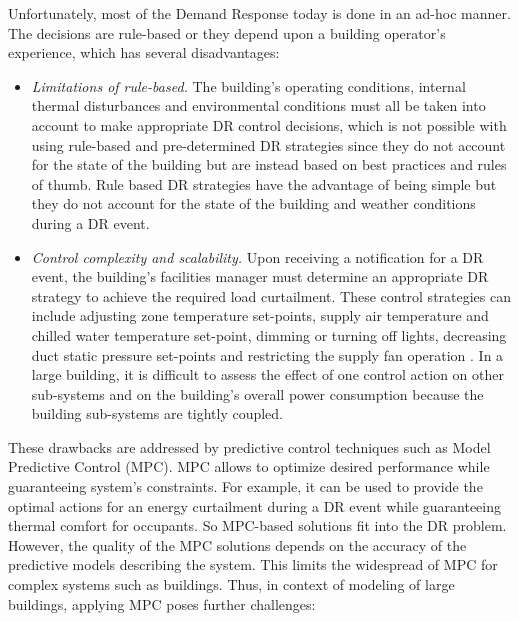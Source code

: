 Unfortunately, most of the Demand Response today is done in an ad-hoc manner. 
The decisions are rule-based or they depend upon a building operator's experience, which has several disadvantages:

\begin{itemize}[leftmargin=0.5cm]
	\item \emph{Limitations of rule-based.} The building's operating conditions, internal thermal disturbances and environmental conditions must all be taken into account to make appropriate DR control decisions, which is not possible with using rule-based and pre-determined DR strategies since they do not account for the state of the building but are instead based on best practices and rules of thumb. 
	Rule based DR strategies have the advantage of being simple but they do not account for the state of the building and weather conditions during a DR event.
	\item \emph{Control complexity and scalability.} Upon receiving a notification for a DR event, the building's facilities manager must determine an appropriate DR strategy to achieve the required load curtailment. 
	These control strategies can include adjusting zone temperature set-points, supply air temperature and chilled water temperature set-point, dimming or turning off lights, decreasing duct static pressure set-points and restricting the supply fan operation \etc. 
	In a large building, it is difficult to assess the effect of one control action on other sub-systems and on the building's overall power consumption because the building sub-systems are tightly coupled.
\end{itemize}
These drawbacks are addressed by predictive control techniques such as Model Predictive Control (MPC). MPC allows to optimize desired performance while guaranteeing system's constraints. For example, it can be used to provide the optimal actions for an energy curtailment during a DR event while guaranteeing thermal comfort for occupants. So MPC-based solutions fit into the DR problem. However, the quality of the MPC solutions depends on the accuracy of the predictive models describing the system. This limits the widespread of MPC for complex systems such as buildings. Thus, in context of modeling of large buildings, applying MPC poses further challenges:

